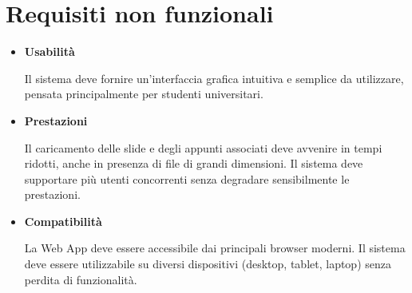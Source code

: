 \section{Requisiti non funzionali}
\begin{itemize}
    \item \textbf{Usabilità}\par
    Il sistema deve fornire un'interfaccia grafica intuitiva e semplice da utilizzare, pensata principalmente per studenti universitari.
    \item \textbf{Prestazioni}\par
    Il caricamento delle slide e degli appunti associati deve avvenire in tempi ridotti, anche in presenza di file di grandi dimensioni. Il sistema deve supportare più utenti concorrenti senza degradare sensibilmente le prestazioni.
    \item \textbf{Compatibilità}\par
    La Web App deve essere accessibile dai principali browser moderni. Il sistema deve essere utilizzabile su diversi dispositivi (desktop, tablet, laptop) senza perdita di funzionalità.
\end{itemize}